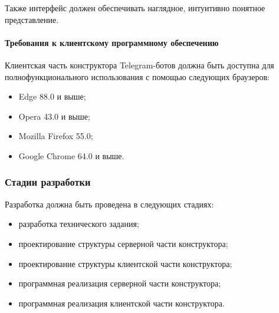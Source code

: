 Также интерфейс должен обеспечивать
наглядное, интуитивно понятное представление.

\paragraph{Требования к клиентскому программному обеспечению}

Клиентская часть конструктора Telegram-ботов должна быть доступна для
полнофункционального использования с помощью следующих браузеров:
\begin{itemize}
	\item Edge 88.0 и выше;
	\item Opera 43.0 и выше;
	\item Mozilla Firefox 55.0;
	\item Google Chrome 64.0 и выше.
\end{itemize}

\subsubsection{Стадии разработки}

Разработка должна быть проведена в следующих стадиях:
\begin{itemize}
	\item разработка технического задания;
	\item проектирование структуры серверной части конструктора;
	\item проектирование структуры клиентской части конструктора;
	\item программная реализация серверной части конструктора;
	\item программная реализация клиентской части конструктора.
\end{itemize}


